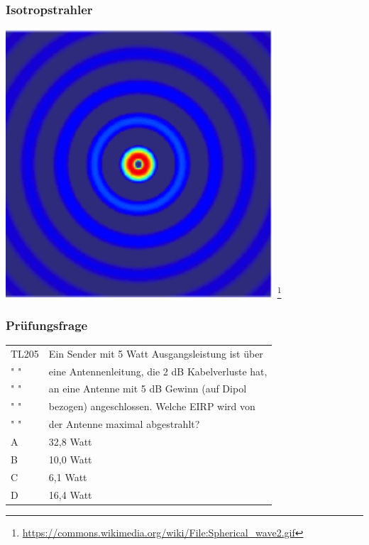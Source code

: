 \begin{frame}
    \frametitle{Isotropstrahler}
    \begin{center}
        \includegraphics[width=0.75\textwidth]{e11/Spherical_wave2.png}
        \footnote{\tiny \url{https://commons.wikimedia.org/wiki/File:Spherical_wave2.gif}}
	\end{center}
\end{frame}

\begin{frame}
    \frametitle{Prüfungsfrage}

    \begin{center}
    \begin{tabular}{l||l}\hline
        TL205 & Ein Sender mit 5 Watt Ausgangsleistung ist über\\
        " "  & eine Antennenleitung, die 2 dB Kabelverluste hat,\\
        " "  & an eine Antenne mit 5 dB Gewinn (auf Dipol\\
        " "  & bezogen) angeschlossen. Welche EIRP wird von \\
        " "  &  der Antenne maximal abgestrahlt?\\\hline\hline
         A 	  & 32,8 Watt \\\hline
         B 	  & 10,0 Watt \\\hline
         C	  & 6,1 Watt \\\hline
         D 	  & 16,4 Watt\\\hline
    \end{tabular}
 	\end{center}
\end{frame}

